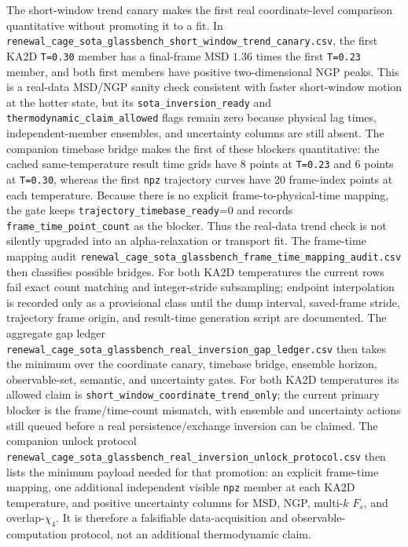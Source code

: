 \documentclass[aps,preprint,onecolumn,superscriptaddress,nofootinbib]{revtex4-2}
\begin{document}
The short-window trend canary makes the first real coordinate-level comparison
quantitative without promoting it to a fit. In
\texttt{renewal\_cage\_sota\_glassbench\_short\_window\_trend\_canary.csv},
the first KA2D \texttt{T=0.30} member has a final-frame MSD \(1.36\) times the
first \texttt{T=0.23} member, and both first members have positive
two-dimensional NGP peaks. This is a real-data MSD/NGP sanity check consistent
with faster short-window motion at the hotter state, but its
\texttt{sota\_inversion\_ready} and \texttt{thermodynamic\_claim\_allowed}
flags remain zero because physical lag times, independent-member ensembles,
and uncertainty columns are still absent.
The companion timebase bridge makes the first of these blockers quantitative:
the cached same-temperature result time grids have 8 points at
\texttt{T=0.23} and 6 points at \texttt{T=0.30}, whereas the first
\texttt{npz} trajectory curves have 20 frame-index points at each temperature.
Because there is no explicit frame-to-physical-time mapping, the gate keeps
\texttt{trajectory\_timebase\_ready}=0 and records
\texttt{frame\_time\_point\_count} as the blocker. Thus the real-data trend
check is not silently upgraded into an alpha-relaxation or transport fit.
The frame-time mapping audit
\texttt{renewal\_cage\_sota\_glassbench\_frame\_time\_mapping\_audit.csv}
then classifies possible bridges. For both KA2D temperatures the current rows
fail exact count matching and integer-stride subsampling; endpoint
interpolation is recorded only as a provisional class until the dump interval,
saved-frame stride, trajectory frame origin, and result-time generation script
are documented.
The aggregate gap ledger
\texttt{renewal\_cage\_sota\_glassbench\_real\_inversion\_gap\_ledger.csv}
then takes the minimum over the coordinate canary, timebase bridge, ensemble
horizon, observable-set, semantic, and uncertainty gates. For both KA2D
temperatures its allowed claim is
\texttt{short\_window\_coordinate\_trend\_only}; the current primary blocker is
the frame/time-count mismatch, with ensemble and uncertainty actions still
queued before a real persistence/exchange inversion can be claimed.
The companion unlock protocol
\texttt{renewal\_cage\_sota\_glassbench\_real\_inversion\_unlock\_protocol.csv}
then lists the minimum payload needed for that promotion: an explicit
frame-time mapping, one additional independent visible \texttt{npz} member at
each KA2D temperature, and positive uncertainty columns for MSD, NGP,
multi-\(k\) \(F_s\), and overlap-\(\chi_4\). It is therefore a falsifiable
data-acquisition and observable-computation protocol, not an additional
thermodynamic claim.
\end{document}
